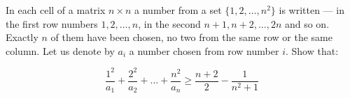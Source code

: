 In each cell of a matrix $ n\times n$ a number from a set $ \{1,2,\ldots,n^2\}$ is written --- in the first row numbers $ 1,2,\ldots,n$, in the second $ n+1,n+2,\ldots,2n$ and so on. Exactly $ n$ of them have been chosen, no two from the same row or the same column. Let us denote by $ a_i$ a number chosen from row number $ i$. Show that:

\[ \frac{1^2}{a_1}+\frac{2^2}{a_2}+\ldots +\frac{n^2}{a_n}\geq \frac{n+2}{2}-\frac{1}{n^2+1}\]